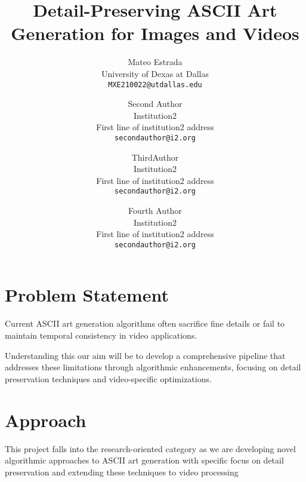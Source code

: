 \documentclass[10pt,twocolumn,letterpaper]{article}
\begin{document}
\title{Detail-Preserving ASCII Art Generation for Images and Videos}

\author{Mateo Estrada\\
University of Dexas at Dallas\\
{\tt\small MXE210022@utdallas.edu}
\and
Second Author\\
Institution2\\
First line of institution2 address\\
{\tt\small secondauthor@i2.org}
\and
ThirdAuthor\\
Institution2\\
First line of institution2 address\\
{\tt\small secondauthor@i2.org}
\and
Fourth Author\\
Institution2\\
First line of institution2 address\\
{\tt\small secondauthor@i2.org}
}
\maketitle

\begin{abstract}
\end{abstract}

\section{Problem Statement}
\label{sec:intro}

Current ASCII art generation algorithms often sacrifice fine details or fail to maintain temporal consistency in video applications.

Understanding this our aim will be to develop a comprehensive pipeline that addresses these limitations through algorithmic enhancements, focusing on detail preservation techniques and video-specific optimizations.


\section{Approach}

This project falls into the research-oriented category as we are developing novel algorithmic approaches to ASCII art generation with specific focus on detail preservation and extending these techniques to video processing
\end{document}
